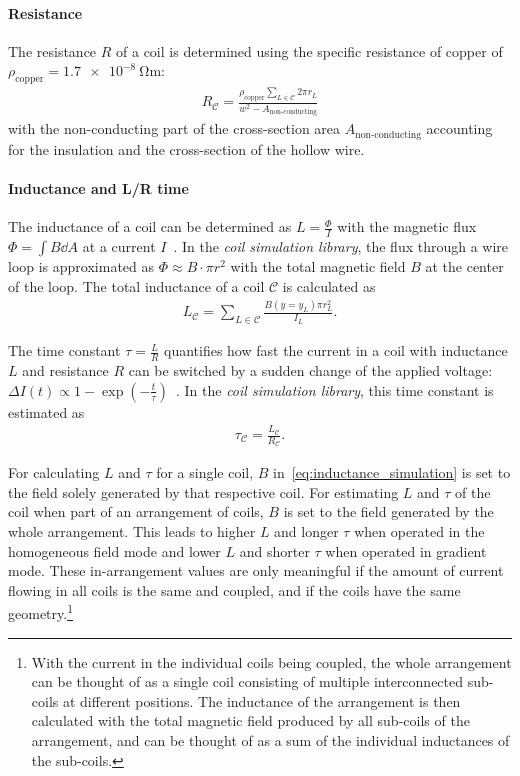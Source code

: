 \paragraph{Resistance}
The resistance $R$ of a coil is determined using the specific resistance of copper of $\rho_\text{copper} = \SI{1.7e-8}{\ohm\meter}$:
\begin{align}\label{eq:resistance_simulation}
    R_\mathcal{C} = \frac{\rho_\text{copper} \sum\limits_{L \in \mathcal{C}} 2\pi r_L} {w^2 - A_\text{non-conducting}}
\end{align}
with the non-conducting part of the cross-section area $A_\text{non-conducting}$ accounting for the insulation and the cross-section of the hollow wire.

\paragraph{Inductance and L/R time} The inductance of a coil can be determined as $L = \frac{\Phi}{I}$ with the magnetic flux $\Phi = \int B \dd A$ at a current $I$~\cite{demtroder_zeitlich_2013}. In the \textit{coil simulation library}, the flux through a wire loop is approximated as $\Phi \approx B \cdot \pi r^2$ with the total magnetic field $B$ at the center of the loop. The total inductance of a coil $\mathcal{C}$ is calculated as
\begin{align}\label{eq:inductance_simulation}
    L_\mathcal{C} = \sum\limits_{L \in \mathcal{C}} \frac{B(y = y_L) \pi r_L^2}{I_L}.
\end{align}

The time constant $\tau = \frac{L}{R}$ quantifies how fast the current in a coil with inductance $L$ and resistance $R$ can be switched by a sudden change of the applied voltage: $\Delta I(t) \propto 1-\exp \left(-\frac{t}{\tau}\right)$~\cite{demtroder_zeitlich_2013}. In the \textit{coil simulation library}, this time constant is estimated as
\begin{align}\label{eq:time_constant_simulation}
    \tau_\mathcal{C} = \frac{L_\mathcal{C}}{R_\mathcal{C}}.
\end{align}

For calculating $L$ and $\tau$ for a single coil, $B$ in~\eqref{eq:inductance_simulation} is set to the field solely generated by that respective coil. For estimating $L$ and $\tau$ of the coil when part of an arrangement of coils, $B$ is set to the field generated by the whole arrangement. This leads to higher $L$ and longer $\tau$ when operated in the homogeneous field mode and lower $L$ and shorter $\tau$ when operated in gradient mode. These in-arrangement values are only meaningful if the amount of current flowing in all coils is the same and coupled, and if the coils have the same geometry.\footnote{With the current in the individual coils being coupled, the whole arrangement can be thought of as a single coil consisting of multiple interconnected sub-coils at different positions. The inductance of the arrangement is then calculated with the total magnetic field produced by all sub-coils of the arrangement, and can be thought of as a sum of the individual inductances of the sub-coils.}

